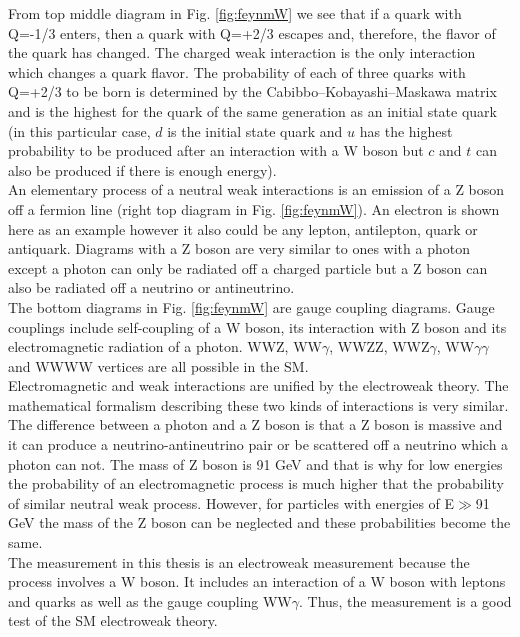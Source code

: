 From top middle diagram in Fig. \ref{fig:feynmW} we see that if a quark with Q=-1/3 enters, then a quark with Q=+2/3 escapes and, therefore, the flavor of the quark has changed. The charged weak interaction is the only interaction which changes a quark flavor. The probability of each of three quarks with Q=+2/3 to be born is determined by the Cabibbo–Kobayashi–Maskawa matrix and is the highest for the quark of the same generation as an initial state quark (in this particular case, $d$ is the initial state quark and $u$ has the highest probability to be produced after an interaction with a W boson but $c$ and $t$ can also be produced if there is enough energy).\\

An elementary process of a neutral weak interactions is an emission of a Z boson off a fermion line (right top diagram in Fig. \ref{fig:feynmW}). An electron is shown here as an example however it also could be any lepton, antilepton, quark or antiquark. Diagrams with a Z boson are very similar to ones with a photon except a photon can only be radiated off a charged particle but a Z boson can also be radiated off a neutrino or antineutrino.\\

The bottom diagrams in Fig. \ref{fig:feynmW} are gauge coupling diagrams. Gauge couplings include self-coupling of a W boson, its interaction with Z boson and its electromagnetic radiation of a photon. WWZ, WW$\gamma$, WWZZ, WWZ$\gamma$, WW$\gamma\gamma$ and WWWW vertices are all possible in the SM.\\

Electromagnetic and weak interactions are unified by the electroweak theory. The mathematical formalism describing these two kinds of interactions is very similar. The difference between a photon and a Z boson is that a Z boson is massive and it can produce a neutrino-antineutrino pair or be scattered off a neutrino which a photon can not. The mass of Z boson is 91 GeV and that is why for low energies the probability of an electromagnetic process is much higher that the probability of similar neutral weak process. However, for particles with energies of E$\gg$91 GeV the mass of the Z boson can be neglected and these probabilities become the same.\\ 

The measurement in this thesis is an electroweak measurement because the process involves a W boson. It includes an interaction of a W boson with leptons and quarks as well as the gauge coupling WW$\gamma$. Thus, the measurement is a good test of the SM electroweak theory.\\ 



